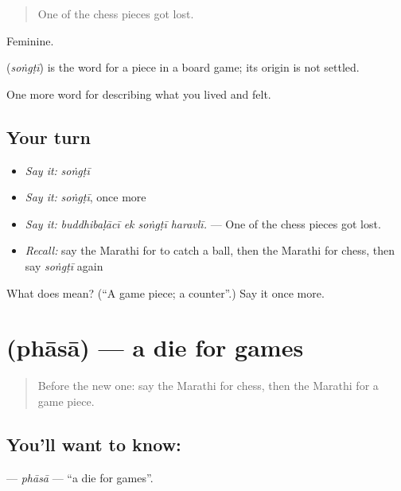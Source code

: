 \begin{quote}
One of the chess pieces got lost.
\end{quote}

Feminine.

\begin{cousinweb}
\textbf{} (\emph{soṅgṭī}) is the word for a piece in a board game; its origin is not settled.
\end{cousinweb}

\begin{grammarlens}[title={What you've built}]
One more word for describing what you lived and felt.
\end{grammarlens}

\subsection*{Your turn}
\begin{itemize}
\raggedright
  \item \emph{Say it:} \emph{soṅgṭī}
  \item \emph{Say it:} \emph{soṅgṭī}, once more
  \item \emph{Say it:} \emph{buddhibaḷācī ek soṅgṭī haravlī.} — One of the chess pieces got lost.
  \item \emph{Recall:} say the Marathi for to catch a ball, then the Marathi for chess, then say \emph{soṅgṭī} again
\end{itemize}

\begin{tcolorbox}[breakable,colback=teal!4,colframe=teal!35!black,title={Before you move on}]
What does  mean? (\textquotedblleft{}A game piece; a counter\textquotedblright{}.) Say it once more.
\end{tcolorbox}
\section[\texorpdfstring{\mr{फासा} (phāsā)}{फासा (phāsā)}]{ (phāsā) — a die for games}

\label{lesson:MR-C532-phasa}



\begin{quote}
Before the new one: say the Marathi for chess, then the Marathi for a game piece.
\end{quote}

\subsection*{You'll want to know: }
\textbf{} — \emph{phāsā} — \textquotedblleft{}a die for games\textquotedblright{}.

